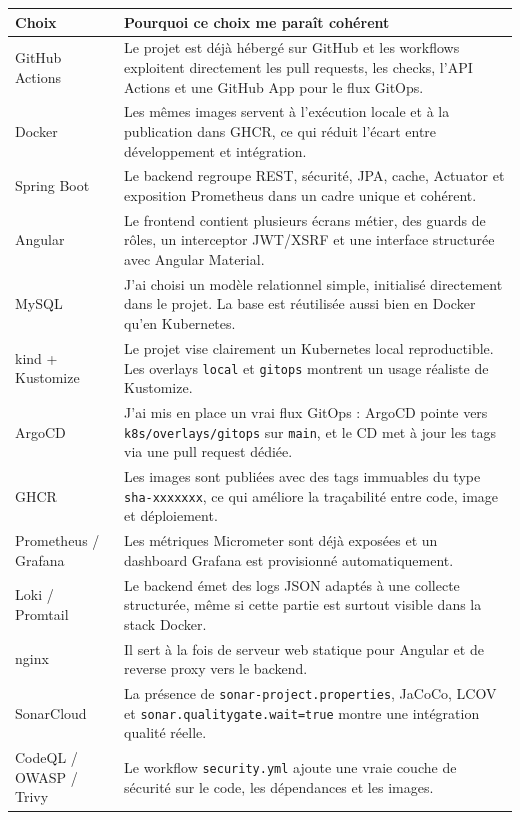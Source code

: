 \documentclass[10pt,a4paper]{article}
\begin{document}
\begin{longtable}{>{\raggedright\arraybackslash}p{} >{\raggedright\arraybackslash}p{}}
\toprule
\textbf{Choix} & \textbf{Pourquoi ce choix me paraît cohérent} \\
\midrule
GitHub Actions & Le projet est déjà hébergé sur GitHub et les workflows exploitent directement les pull requests, les checks, l'API Actions et une GitHub App pour le flux GitOps. \\
Docker & Les mêmes images servent à l'exécution locale et à la publication dans GHCR, ce qui réduit l'écart entre développement et intégration. \\
Spring Boot & Le backend regroupe REST, sécurité, JPA, cache, Actuator et exposition Prometheus dans un cadre unique et cohérent. \\
Angular & Le frontend contient plusieurs écrans métier, des guards de rôles, un interceptor JWT/XSRF et une interface structurée avec Angular Material. \\
MySQL & J'ai choisi un modèle relationnel simple, initialisé directement dans le projet. La base est réutilisée aussi bien en Docker qu'en Kubernetes. \\
kind + Kustomize & Le projet vise clairement un Kubernetes local reproductible. Les overlays \texttt{local} et \texttt{gitops} montrent un usage réaliste de Kustomize. \\
ArgoCD & J'ai mis en place un vrai flux GitOps : ArgoCD pointe vers \texttt{k8s/overlays/gitops} sur \texttt{main}, et le CD met à jour les tags via une pull request dédiée. \\
GHCR & Les images sont publiées avec des tags immuables du type \texttt{sha-xxxxxxx}, ce qui améliore la traçabilité entre code, image et déploiement. \\
Prometheus / Grafana & Les métriques Micrometer sont déjà exposées et un dashboard Grafana est provisionné automatiquement. \\
Loki / Promtail & Le backend émet des logs JSON adaptés à une collecte structurée, même si cette partie est surtout visible dans la stack Docker. \\
nginx & Il sert à la fois de serveur web statique pour Angular et de reverse proxy vers le backend. \\
SonarCloud & La présence de \texttt{sonar-project.properties}, JaCoCo, LCOV et \texttt{sonar.qualitygate.wait=true} montre une intégration qualité réelle. \\
CodeQL / OWASP / Trivy & Le workflow \texttt{security.yml} ajoute une vraie couche de sécurité sur le code, les dépendances et les images. \\
\bottomrule
\end{longtable}
\end{document}
